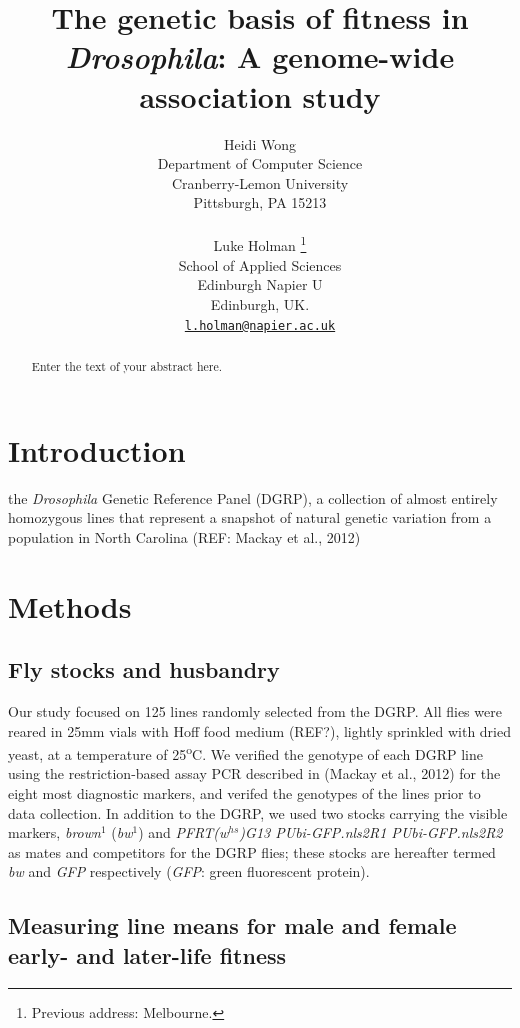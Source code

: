 \documentclass{article}
\title{The genetic basis of fitness in \textit{Drosophila}: A genome-wide
association study}
\author{
    Heidi Wong
   \\
    Department of Computer Science \\
    Cranberry-Lemon University \\
  Pittsburgh, PA 15213 \\
  \texttt{} \\
   \And
    Luke Holman
    \thanks{Previous address: Melbourne.}
   \\
    School of Applied Sciences \\
    Edinburgh Napier U \\
  Edinburgh, UK. \\
  \texttt{\href{mailto:l.holman@napier.ac.uk}{\nolinkurl{l.holman@napier.ac.uk}}} \\
  }
\begin{document}
\maketitle

\def\tightlist{}


\begin{abstract}
Enter the text of your abstract here.
\end{abstract}


\section*{Introduction}
\lipsum[2]

the \textit{Drosophila} Genetic Reference Panel (DGRP), a collection of
almost entirely homozygous lines that represent a snapshot of natural
genetic variation from a population in North Carolina (REF: Mackay et
al., 2012)

\section*{Methods}

\subsection*{Fly stocks and husbandry}

Our study focused on 125 lines randomly selected from the DGRP. All
flies were reared in 25mm vials with Hoff food medium (REF?), lightly
sprinkled with dried yeast, at a temperature of 25\textsuperscript{o}C.
We verified the genotype of each DGRP line using the restriction-based
assay PCR described in (Mackay et al., 2012) for the eight most
diagnostic markers, and verifed the genotypes of the lines prior to data
collection. In addition to the DGRP, we used two stocks carrying the
visible markers, \textit{brown$^1$} (\textit{bw$^1$}) and
\textit{P{FRT(w$^{hs}$)}G13 P{Ubi-GFP.nls}2R1 P{Ubi-GFP.nls}2R2} as
mates and competitors for the DGRP flies; these stocks are hereafter
termed \emph{bw} and \emph{GFP} respectively (\emph{GFP}: green
fluorescent protein).

\subsection*{Measuring line means for male and female early- and later-life fitness}
\end{document}
